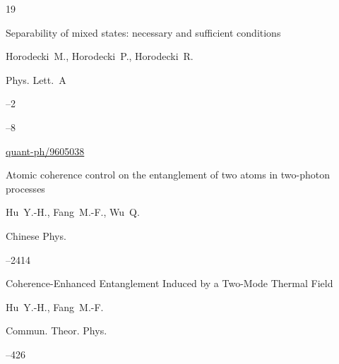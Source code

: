 \begin{thebibliography}{19}

\paper  Separability of mixed states: necessary and sufficient conditions 

\by    Horodecki~M.,  Horodecki~P.,   Horodecki~R.

\jour Phys. Lett.~A



--2

--8


\arxiv \href{http://arxiv.org/abs/quant-ph/9605038}{quant-ph/9605038}






\paper Atomic coherence control on the entanglement of two atoms in two-photon processes

\by     Hu~Y.-H.,  Fang~M.-F., Wu~Q. 

\jour Chinese Phys.




--2414





\paper Coherence-Enhanced Entanglement Induced by a Two-Mode Thermal Field

\by     Hu~Y.-H.,  Fang~M.-F. 

\jour  Commun. Theor. Phys. 




--426




\end{thebibliography}



\renewcommand{\baselinestretch}{0.9}



\RuDate



\newpage





